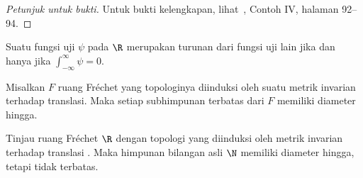\begin{proof}[\emph{Petunjuk untuk bukti}] Untuk bukti kelengkapan, lihat~\cite{Treves:1967}, Contoh IV, halaman 92--94. \ns
\end{proof}

\begin{prop} Suatu fungsi uji $\psi$ pada $\R$ merupakan turunan dari fungsi uji lain jika dan hanya jika $\int_{-\infty}^\infty\psi = 0$.
\end{prop}

\begin{prop} Misalkan $F$ ruang Fr\'echet yang topologinya diinduksi oleh suatu metrik invarian terhadap translasi. Maka setiap subhimpunan terbatas
dari $F$ memiliki diameter hingga.
\end{prop}

\begin{exam} Tinjau ruang Fr\'echet $\R$ dengan topologi yang diinduksi oleh metrik invarian terhadap translasi
. Maka himpunan bilangan asli $\N$ memiliki diameter hingga, tetapi tidak terbatas.
\end{exam}




































\endinput
